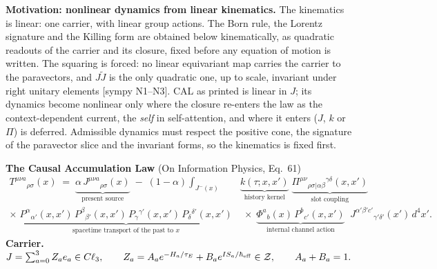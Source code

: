 \documentclass[10pt]{article}
\newcommand{\Cl}{C\ell_3}
\newcommand{\rv}[1]{\widetilde{#1}}
\newcommand{\Zc}{\mathcal Z}
\newcommand{\tg}[1]{{\scriptsize[#1]}}
\begin{document}
\vspace{2pt}
\textbf{Motivation: nonlinear dynamics from linear kinematics.} The kinematics is linear: one carrier, with linear group actions. The Born rule, the Lorentz signature and the Killing form are obtained below kinematically, as quadratic readouts of the carrier and its closure, fixed before any equation of motion is written. The squaring is forced: no linear equivariant map carries the carrier to the paravectors, and $J\rv J$ is the only quadratic one, up to scale, invariant under right unitary elements \tg{sympy N1--N3}. CAL as printed is linear in $J$; its dynamics become nonlinear only where the closure re-enters the law as the context-dependent current, the \emph{self} in self-attention, and where it enters ($J$, $k$ or $\Pi$) is deferred. Admissible dynamics must respect the positive cone, the signature of the paravector slice and the invariant forms, so the kinematics is fixed first.\par
{\large\textbf{The Causal Accumulation Law}} (On Information Physics, Eq.~61)
\[
\begin{aligned}
T^{\mu\nu a}{}_{\rho\sigma}(x) \;=\; \underbrace{\alpha\, J^{\mu\nu a}{}_{\rho\sigma}(x)}_{\text{present source}} \;-\; (1-\alpha)\int_{J^-(x)} &\underbrace{k(\tau;x,x')}_{\text{history kernel}}\;\underbrace{\Pi^{\mu\nu}{}_{\rho\sigma|\alpha\beta}{}^{\gamma\delta}(x,x')}_{\text{slot coupling}}\\
\times\;\underbrace{P^{\alpha}{}_{\alpha'}(x,x')\,P^{\beta}{}_{\beta'}(x,x')\,P_{\gamma}{}^{\gamma'}(x,x')\,P_{\delta}{}^{\delta'}(x,x')}_{\text{spacetime transport of the past to }x}
&\;\times\;\underbrace{\Phi^{a}{}_{b}(x)\,P^{b}{}_{c'}(x,x')}_{\text{internal channel action}}\;\; J^{\alpha'\beta'c'}{}_{\gamma'\delta'}(x')\,d^4x'.
\end{aligned}
\]
{\large\textbf{Carrier.}}\quad $J=\sum_{a=0}^{3}Z_ae_a\in\Cl,\qquad Z_a=A_ae^{-H_a/\tau_E}+B_ae^{IS_a/\hbar_{\rm eff}}\in\Zc,\qquad A_a+B_a=1.$
\end{document}
